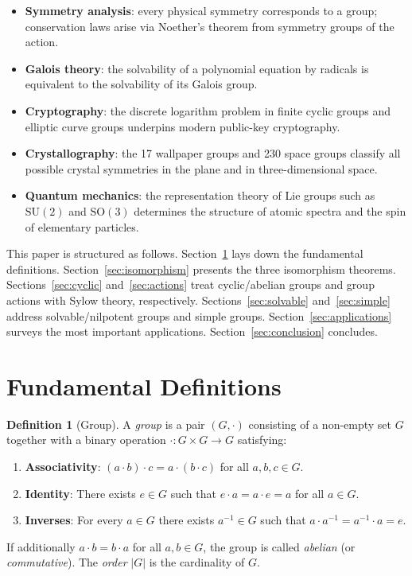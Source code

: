 \documentclass[12pt,a4paper]{amsart}
\theoremstyle{definition}
\newtheorem{definition}[theorem]{Definition}
\begin{document}
\begin{itemize}[leftmargin=2em]
  \item \textbf{Symmetry analysis}: every physical symmetry corresponds to a group;
        conservation laws arise via Noether's theorem from symmetry groups of the action.
  \item \textbf{Galois theory}: the solvability of a polynomial equation by radicals is
        equivalent to the solvability of its Galois group.
  \item \textbf{Cryptography}: the discrete logarithm problem in finite cyclic groups and
        elliptic curve groups underpins modern public-key cryptography.
  \item \textbf{Crystallography}: the 17 wallpaper groups and 230 space groups classify
        all possible crystal symmetries in the plane and in three-dimensional space.
  \item \textbf{Quantum mechanics}: the representation theory of Lie groups such as
        $\mathrm{SU}(2)$ and $\mathrm{SO}(3)$ determines the structure of atomic spectra
        and the spin of elementary particles.
\end{itemize}

This paper is structured as follows. Section~\ref{sec:definitions} lays down the
fundamental definitions. Section~\ref{sec:isomorphism} presents the three isomorphism
theorems. Sections~\ref{sec:cyclic} and~\ref{sec:actions} treat cyclic/abelian groups
and group actions with Sylow theory, respectively. Sections~\ref{sec:solvable}
and~\ref{sec:simple} address solvable/nilpotent groups and simple groups.
Section~\ref{sec:applications} surveys the most important applications.
Section~\ref{sec:conclusion} concludes.

\section{Fundamental Definitions}
\label{sec:definitions}

\begin{definition}[Group]
A \emph{group} is a pair $(G, \cdot)$ consisting of a non-empty set $G$ together with
a binary operation $\cdot : G \times G \to G$ satisfying:
\begin{enumerate}[label=(\roman*)]
  \item \textbf{Associativity}: $(a \cdot b) \cdot c = a \cdot (b \cdot c)$ for all
        $a,b,c \in G$.
  \item \textbf{Identity}: There exists $e \in G$ such that $e \cdot a = a \cdot e = a$
        for all $a \in G$.
  \item \textbf{Inverses}: For every $a \in G$ there exists $a^{-1} \in G$ such that
        $a \cdot a^{-1} = a^{-1} \cdot a = e$.
\end{enumerate}
If additionally $a \cdot b = b \cdot a$ for all $a, b \in G$, the group is called
\emph{abelian} (or \emph{commutative}). The \emph{order} $|G|$ is the cardinality of $G$.
\end{definition}
\end{document}
